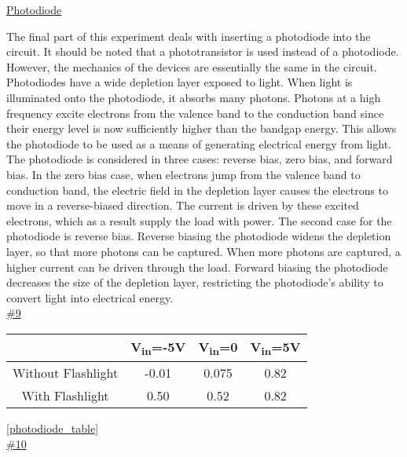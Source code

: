 \underline{Photodiode}

The final part of this experiment deals with inserting a photodiode into the circuit. It should be noted that a phototransistor is used instead of a photodiode. However, the mechanics of the devices are essentially the same in the circuit. Photodiodes have a wide depletion layer exposed to light. When light is illuminated onto the photodiode, it absorbs many photons. Photons at a high frequency excite electrons from the valence band to the conduction band since their energy level is now sufficiently higher than the bandgap energy. This allows the photodiode to be used as a means of generating electrical energy from light.
The photodiode is considered in three cases: reverse bias, zero bias, and forward bias. In the zero bias case, when electrons jump from the valence band to conduction band, the electric field in the depletion layer causes the electrons to move in a reverse-biased direction. The current is driven by these excited electrons, which as a result supply the load with power. The second case for the photodiode is reverse bias. Reverse biasing the photodiode widens the depletion layer, so that more photons can be captured. When more photons are captured, a higher current can be driven through the load. Forward biasing the photodiode decreases the size of the depletion layer, restricting the photodiode's ability to convert light into electrical energy. \\
\underline{\#9}

\centering
\begin{tabular}{| c | c | c | c |}\hline
	& V\textsubscript{in}=-5V & V\textsubscript{in}=0 & V\textsubscript{in}=5V \\\hline
	Without Flashlight & -0.01 & 0.075 & 0.82\\\hline
	With Flashlight & 0.50 & 0.52 & 0.82 \\\hline
\end{tabular}
\label{Voltage over Photodiode}
\ref{photodiode_table}
\\

\underline{\#10}
\\

